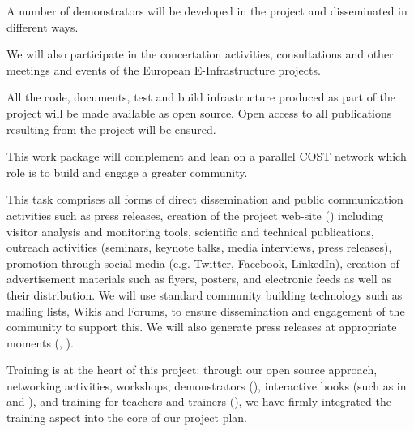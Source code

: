 \begin{workpackage}
\begin{wpdescription}
  A number of demonstrators will be developed in the project and
  disseminated in different ways.

  We will also participate in the concertation activities,
  consultations and other meetings and events of the European
  E-Infrastructure projects.

  All the code, documents, test and build infrastructure produced as
  part of the project will be made available as open source.
  Open access to all publications resulting from the project will be ensured.

  This work package will complement and lean on a parallel COST
  network which role is to build and engage a greater community.
\end{wpdescription}

\begin{tasklist}

\begin{task}[title=Dissemination and Communication activities, lead=PS, partners={SA}, id=dissemination-communication, PM=11, wphases=0-48, issue=24 ]
  This task comprises all forms of direct dissemination and public
  communication activities such as press releases, creation of the
  project web-site () including visitor analysis and monitoring tools,
  scientific and technical publications, outreach activities
  (seminars, keynote talks, media interviews, press releases),
  promotion through social media (e.g. Twitter, Facebook, LinkedIn),
  creation of advertisement materials such as flyers, posters, and
  electronic feeds as well as their distribution. We will use standard
  community building technology such as mailing lists, Wikis and
  Forums, to ensure dissemination and engagement of the community to
  support this. We will also generate press releases at appropriate
  moments (, ). %


\end{task}

\begin{task}[title=Training and training portal,
id=training-portal,lead=PS,PM=1,wphases={0-48!.1,0-1},issue=25]
Training is at the heart of this project: through our open source
approach, networking activities, workshops, demonstrators
(), interactive books (such
as in  and
), and training for teachers and trainers
(), we have firmly integrated the training
aspect into the core of our project plan.


\end{task}
\end{tasklist}
\end{workpackage}
